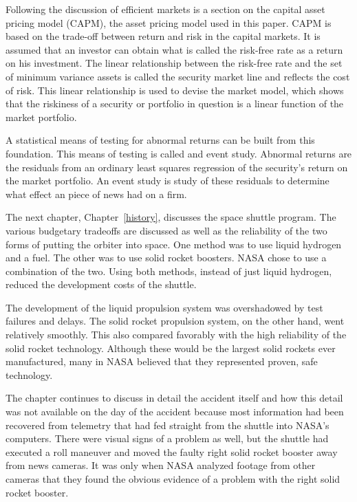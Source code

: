 Following the discussion of efficient markets is a section on the capital asset pricing model (CAPM), the asset pricing model used in this paper. CAPM is based on the trade-off between return and risk in the capital markets. It is assumed that an investor can obtain what is called the risk-free rate as a return on his investment. The linear relationship between the risk-free rate and the set of minimum variance assets is called the security market line and reflects the cost of risk. This linear relationship is used to devise the market model, which shows that the riskiness of a security or portfolio in question is a linear function of the market portfolio.

A statistical means of testing for abnormal returns can be built from this foundation. This means of testing is called and event study. Abnormal returns are the residuals from an ordinary least squares regression of the security's return on the market portfolio. An event study is study of these residuals to determine what effect an piece of news had on a firm.

The next chapter, Chapter~\ref{history}, discusses the space shuttle program. The various budgetary tradeoffs are discussed as well as the reliability of the two forms of putting the orbiter into space. One method was to use liquid hydrogen and a fuel. The other was to use solid rocket boosters. NASA chose to use a combination of the two. Using both methods, instead of just liquid hydrogen, reduced the development costs of the shuttle.

The development of the liquid propulsion system was overshadowed by test failures and delays. The solid rocket propulsion system, on the other hand, went relatively smoothly. This also compared favorably with the high reliability of the solid rocket technology. Although these would be the largest solid rockets ever manufactured, many in NASA believed that they represented proven, safe technology.

The chapter continues to discuss in detail the accident itself and how this detail was not available on the day of the accident because most information had been recovered from telemetry that had fed straight from the shuttle into NASA's computers. There were visual signs of a problem as well, but the shuttle had executed a roll maneuver and moved the faulty right solid rocket booster away from news cameras. It was only when NASA analyzed footage from other cameras that they found the obvious evidence of a problem with the right solid rocket booster.

